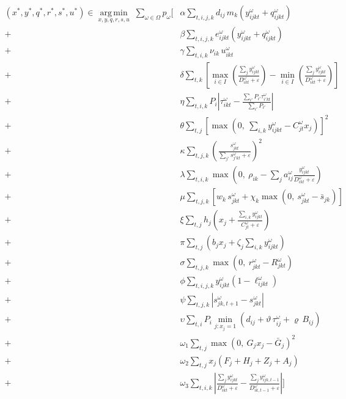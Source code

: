 \documentclass[11pt,oneside]{book}
\begin{document}
\begin{align*}
(x^*, y^*, q^*, r^*, s^*, u^*) \in \operatorname*{arg\,min}_{x,y,q,r,s,u} \; \sum_{\omega \in \Omega} p_\omega \Bigg[ 
& \alpha \sum_{t,i,j,k} d_{ij}\, m_k \left( y_{ijkt}^{\omega} + q_{ijkt}^{\omega} \right) \\
+ {} & \beta \sum_{t,i,j,k} e_{ijkt}^{\omega} \left( y_{ijkt}^{\omega} + q_{ijkt}^{\omega} \right) \\
+ {} & \gamma \sum_{t,i,k} \nu_{ik}\, u_{ikt}^{\omega} \\
+ {} & \delta \sum_{t,k} \left[ \max_{i \in I} \left( \frac{\sum_j y_{ijkt}^{\omega}}{D_{ikt}^{\omega} + \varepsilon} \right) - \min_{i \in I} \left( \frac{\sum_j y_{ijkt}^{\omega}}{D_{ikt}^{\omega} + \varepsilon} \right) \right] \\
+ {} & \eta \sum_{t,i,k} P_i \left| \tau_{ikt}^{\omega} - \frac{\sum_{i'} P_{i'} \tau_{i'kt}^{\omega}}{\sum_{i'} P_{i'}} \right| \\
+ {} & \theta \sum_{t,j} \left[ \max\left(0,\ \sum_{i,k} y_{ijkt}^{\omega} - C_{jt}^{\omega} x_j \right) \right]^2 \\
+ {} & \kappa \sum_{t,j,k} \left( \frac{s_{jkt}^{\omega}}{\sum_{j'} s_{j'kt}^{\omega} + \varepsilon} \right)^2 \\
+ {} & \lambda \sum_{t,i,k} \max\left(0,\ \rho_{ik} - \sum_j a_{ij}^{\omega} \frac{y_{ijkt}^{\omega}}{D_{ikt}^{\omega} + \varepsilon} \right) \\
+ {} & \mu \sum_{t,j,k} \left[ w_k\, s_{jkt}^{\omega} + \chi_k \max\left(0,\ s_{jkt}^{\omega} - \bar{s}_{jk} \right) \right] \\
+ {} & \xi \sum_{t,j} h_j \left( x_j + \frac{\sum_{i,k} y_{ijkt}^{\omega}}{C_{jt}^{\omega} + \varepsilon} \right) \\
+ {} & \pi \sum_{t,j} \left( b_j x_j + \zeta_j \sum_{i,k} y_{ijkt}^{\omega} \right) \\
+ {} & \sigma \sum_{t,j,k} \max\left(0,\ r_{jkt}^{\omega} - R_{jkt}^{\omega} \right) \\
+ {} & \phi \sum_{t,i,j,k} y_{ijkt}^{\omega} \left(1 - \ell_{ijkt}^{\omega}\right) \\
+ {} & \psi \sum_{t,j,k} \left| s_{jk,t+1}^{\omega} - s_{jkt}^{\omega} \right| \\
+ {} & \upsilon \sum_{t,i} P_i \min_{j : x_j = 1} \left( d_{ij} + \vartheta\, \tau_{ij}^{\omega} + \varrho\, B_{ij} \right) \\
+ {} & \omega_1 \sum_{t,j} \max\left(0,\ G_j x_j - \bar{G}_j \right)^2 \\
+ {} & \omega_2 \sum_{t,j} x_j \left( F_j + H_j + Z_j + A_j \right) \\
+ {} & \omega_3 \sum_{t,i,k} \left| \frac{\sum_j y_{ijkt}^{\omega}}{D_{ikt}^{\omega} + \varepsilon} - \frac{\sum_j y_{ijk,t-1}^{\omega}}{D_{ik,t-1}^{\omega} + \varepsilon} \right| \Bigg]
\end{align*}
\end{document}
